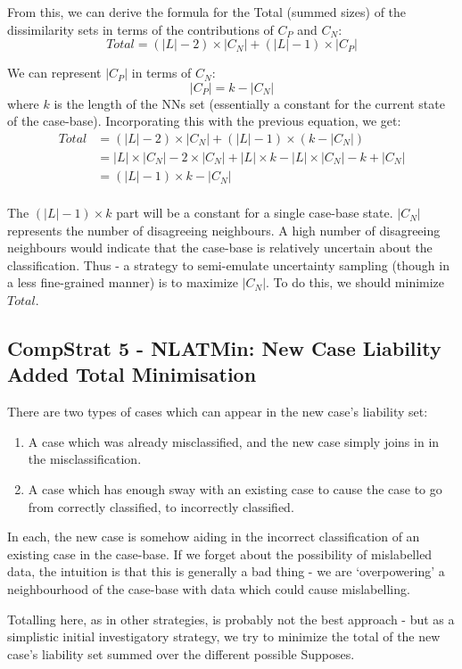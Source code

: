 \documentclass[a4paper,11pt]{report}
\begin{document}
From this, we can derive the formula for the Total (summed sizes) of the dissimilarity sets in terms of the contributions of $C_{P}$ and $C_{N}$:
\[ Total= (|L| - 2)\times |C_{N}| +(|L| - 1)\times |C_{P}|  \] 

We can represent $|C_{P}|$ in terms of $C_{N}$:
\[ |C_{P}| = k -  |C_{N}| \]
where $k$ is the length of the NNs set (essentially a constant for the current state of the case-base). Incorporating this with the previous equation, we get:
\begin{align*}
Total &= (|L| - 2)\times |C_{N}| +(|L| - 1)\times (k - |C_{N}|) \\
&= |L| \times |C_{N}| - 2\times|C_{N}| + |L|\times k - |L| \times |C_{N}| - k + |C_{N}| \\
&= (|L| - 1) \times k - |C_{N}| \\
\end{align*} 

The $ (|L| - 1) \times k $ part will be a constant for a single case-base state. $|C_{N}|$ represents the number of disagreeing neighbours. A high number of disagreeing neighbours would indicate that the case-base is relatively uncertain about the classification. Thus - a strategy to semi-emulate uncertainty sampling (though in a less fine-grained manner) is to maximize $|C_{N}|$. To do this, we should minimize $Total$.

\subsection{CompStrat 5 - NLATMin: New Case Liability Added Total Minimisation}
There are two types of cases which can appear in the new case's liability set:
\begin{enumerate}
	\item A case which was already misclassified, and the new case simply joins in in the misclassification.
	\item A case which has enough sway with an existing case to cause the case to go from correctly classified, to incorrectly classified.
\end{enumerate}

In each, the new case is somehow aiding in the incorrect classification of an existing case in the case-base. If we forget about the possibility of mislabelled data, the intuition is that this is generally a bad thing - we are `overpowering' a neighbourhood of the case-base with data which could cause mislabelling.

Totalling here, as in other strategies, is probably not the best approach - but as a simplistic initial investigatory strategy, we try to minimize the total of the new case's liability set summed over the different possible Supposes.
\end{document}
